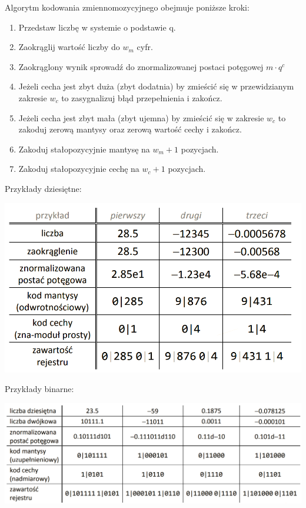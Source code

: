 \documentclass[12pt]{article}
\begin{document}
    Algorytm kodowania zmiennomozycyjnego obejmuje poniższe kroki:
    \begin{enumerate}
        \item Przedstaw liczbę w systemie o podstawie q.
        \item Zaokrąglij wartość liczby do $w_m$ cyfr.
        \item Zaokrąglony wynik sprowadź do znormalizowanej postaci
        potęgowej $m\cdot q^c$
        \item Jeżeli cecha jest zbyt duża (zbyt dodatnia) by zmieścić się
        w przewidzianym zakresie $w_c$ to zasygnalizuj błąd przepełnienia i zakończ.
        \item Jeżeli cecha jest zbyt mała (zbyt ujemna) by zmieścić się
        w zakresie $w_c$ to zakoduj zerową mantysy oraz zerową wartość cechy i zakończ.
        \item Zakoduj stałopozycyjnie mantysę na $w_m + 1$ pozycjach.
        \item Zakoduj stałopozycyjnie cechę na $w_c + 1$ pozycjach.
    \end{enumerate}

    Przykłady dziesiętne:

    \begin{center}
        \includegraphics[scale=0.4]{graphics/number-repr/fl-pt-encode-dec.png}
    \end{center}

    Przykłady binarne:

    \includegraphics[width=\linewidth]{graphics/number-repr/fl-pt-encode-bin.png}
\end{document}

